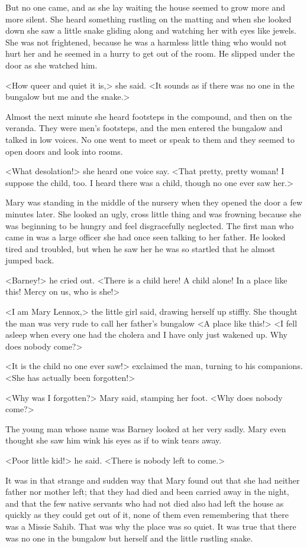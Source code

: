 But no one came, and as she lay waiting the house seemed to grow more and more silent. She heard something rustling on the matting and when she looked down she saw a little snake gliding along and watching her with eyes like jewels. She was not frightened, because he was a harmless little thing who would not hurt her and he seemed in a hurry to get out of the room. He slipped under the door as she watched him.

<How queer and quiet it is,> she said. <It sounds as if there was no one in the bungalow but me and the snake.>

Almost the next minute she heard footsteps in the compound, and then on the veranda. They were men's footsteps, and the men entered the bungalow and talked in low voices. No one went to meet or speak to them and they seemed to open doors and look into rooms.

<What desolation!> she heard one voice say. <That pretty, pretty woman! I suppose the child, too. I heard there was a child, though no one ever saw her.>

Mary was standing in the middle of the nursery when they opened the door a few minutes later. She looked an ugly, cross little thing and was frowning because she was beginning to be hungry and feel disgracefully neglected. The first man who came in was a large officer she had once seen talking to her father. He looked tired and troubled, but when he saw her he was so startled that he almost jumped back.

<Barney!> he cried out. <There is a child here! A child alone! In a place like this! Mercy on us, who is she!>

<I am Mary Lennox,> the little girl said, drawing herself up stiffly. She thought the man was very rude to call her father's bungalow <A place like this!> <I fell asleep when every one had the cholera and I have only just wakened up. Why does nobody come?>

<It is the child no one ever saw!> exclaimed the man, turning to his companions. <She has actually been forgotten!>

<Why was I forgotten?> Mary said, stamping her foot. <Why does nobody come?>

The young man whose name was Barney looked at her very sadly. Mary even thought she saw him wink his eyes as if to wink tears away.

<Poor little kid!> he said. <There is nobody left to come.>

It was in that strange and sudden way that Mary found out that she had neither father nor mother left; that they had died and been carried away in the night, and that the few native servants who had not died also had left the house as quickly as they could get out of it, none of them even remembering that there was a Missie Sahib. That was why the place was so quiet. It was true that there was no one in the bungalow but herself and the little rustling snake.